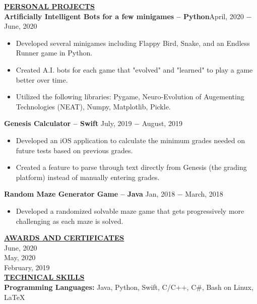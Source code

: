 \documentclass{article}
\begin{document}
\noindent \textbf{\underline{PERSONAL PROJECTS}} \\
\noindent \textbf{Artificially Intelligent Bots for a few minigames -- Python}\hfill  April, 2020 $-$ June, 2020
\begin{itemize}[noitemsep,nolistsep,leftmargin=*]
\item {Developed several minigames including Flappy Bird, Snake, and an Endless Runner game in Python.}
\item {Created A.I. bots for each game that "evolved" and "learned" to play a game better over time.}
\item {Utilized the following libraries: Pygame, Neuro-Evolution of Augementing Technologies (NEAT), Numpy, Matplotlib, Pickle.}\\
\end{itemize}

\noindent \textbf{Genesis Calculator -- Swift} \hfill  July, 2019 $-$ August, 2019
\begin{itemize}[noitemsep,nolistsep,leftmargin=*]
\item {Developed an iOS application to calculate the minimum grades needed on future tests based on previous grades.}
\item {Created a feature to parse through text directly from Genesis (the grading platform) instead of manually entering grades.}\\
\end{itemize}

\noindent \textbf{Random Maze Generator Game -- Java} \hfill  Jan, 2018 $-$ March, 2018
\begin{itemize}[noitemsep,nolistsep,leftmargin=*]
\item {Developed a randomized solvable maze game that gets progressively more challenging as each maze is solved.}\\
\end{itemize}




\noindent \textbf{\underline{AWARDS AND CERTIFICATES}} \\
 \hfill June, 2020 \\
 \hfill May, 2020 \\
 \hfill February, 2019 \\



\noindent \textbf{\underline{TECHNICAL SKILLS}} \\
\noindent \textbf{Programming Languages:} Java, Python, Swift, C/C++, C\#, Bash on Linux, LaTeX\\
\end{document}
